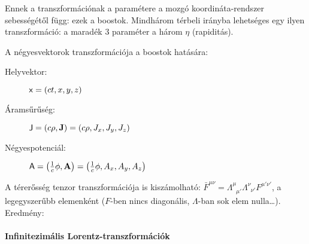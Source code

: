    Ennek a transzformációnak a paramétere a mozgó koordináta-rendszer sebességétől függ: ezek a boostok. Mindhárom térbeli irányba lehetséges egy ilyen transzformáció: a maradék 3 paraméter a három $\eta$ (rapiditás). 
    
    A négyesvektorok transzformációja a boostok hatására:
    \begin{description}
     \item[Helyvektor:] $\mathsf{x}=(ct,x,y,z)$
     \item[Áramsűrűség:] $\mathsf{J}=(c\rho,\mathbf{J})=(c\rho,J_x,J_y,J_z)$
     \item[Négyespotenciál:] $\mathsf{A}=\left(\frac{1}{c}\phi,\mathbf{A}\right)=\left(\frac{1}{c}\phi,A_x,A_y,A_z\right)$
    \end{description}
    A térerősség tenzor transzformációja is kiszámolható: $\bar{F}^{\mu\nu}=\Lambda^\mu_{\phantom{\mu}\mu'}\Lambda^\nu_{\phantom{\nu}\nu'} F^{\mu'\nu'}$, a legegyszerűbb elemenként ($F$-ben nincs diagonális, $\Lambda$-ban sok elem nulla\dots). Eredmény:
   
   \paragraph{Infinitezimális Lorentz-transzformációk}
    
